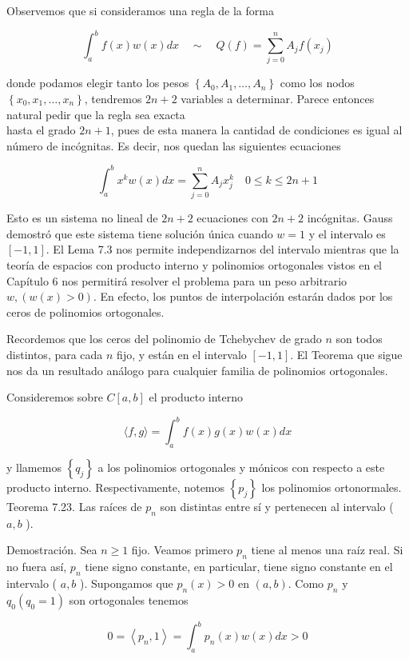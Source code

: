 \documentclass[10pt]{article}
\begin{document}
Observemos que si consideramos una regla de la forma

$$
\int_{a}^{b} f(x) w(x) d x \quad \sim \quad Q(f)=\sum_{j=0}^{n} A_{j} f\left(x_{j}\right)
$$

donde podamos elegir tanto los pesos $\left\{A_{0}, A_{1}, \ldots, A_{n}\right\}$ como los nodos $\left\{x_{0}, x_{1}, \ldots, x_{n}\right\}$, tendremos $2 n+2$ variables a determinar. Parece entonces natural pedir que la regla sea exacta\\
hasta el grado $2 n+1$, pues de esta manera la cantidad de condiciones es igual al número de incógnitas. Es decir, nos quedan las siguientes ecuaciones

$$
\int_{a}^{b} x^{k} w(x) d x=\sum_{j=0}^{n} A_{j} x_{j}^{k} \quad 0 \leq k \leq 2 n+1
$$

Esto es un sistema no lineal de $2 n+2$ ecuaciones con $2 n+2$ incógnitas. Gauss demostró que este sistema tiene solución única cuando $w=1$ y el intervalo es $[-1,1]$. El Lema 7.3 nos permite independizarnos del intervalo mientras que la teoría de espacios con producto interno y polinomios ortogonales vistos en el Capítulo 6 nos permitirá resolver el problema para un peso arbitrario $w,(w(x)>0)$. En efecto, los puntos de interpolación estarán dados por los ceros de polinomios ortogonales.

Recordemos que los ceros del polinomio de Tchebychev de grado $n$ son todos distintos, para cada $n$ fijo, y están en el intervalo $[-1,1]$. El Teorema que sigue nos da un resultado análogo para cualquier familia de polinomios ortogonales.

Consideremos sobre $C[a, b]$ el producto interno

$$
\langle f, g\rangle=\int_{a}^{b} f(x) g(x) w(x) d x
$$

y llamemos $\left\{q_{j}\right\}$ a los polinomios ortogonales y mónicos con respecto a este producto interno. Respectivamente, notemos $\left\{p_{j}\right\}$ los polinomios ortonormales.\\
Teorema 7.23. Las raíces de $p_{n}$ son distintas entre sí y pertenecen al intervalo ( $a, b$ ).

Demostración. Sea $n \geq 1$ fijo. Veamos primero $p_{n}$ tiene al menos una raíz real. Si no fuera así, $p_{n}$ tiene signo constante, en particular, tiene signo constante en el intervalo ( $a, b$ ). Supongamos que $p_{n}(x)>0$ en $(a, b)$. Como $p_{n}$ y $q_{0}\left(q_{0}=1\right)$ son ortogonales tenemos

$$
0=\left\langle p_{n}, 1\right\rangle=\int_{a}^{b} p_{n}(x) w(x) d x>0
$$
\end{document}
